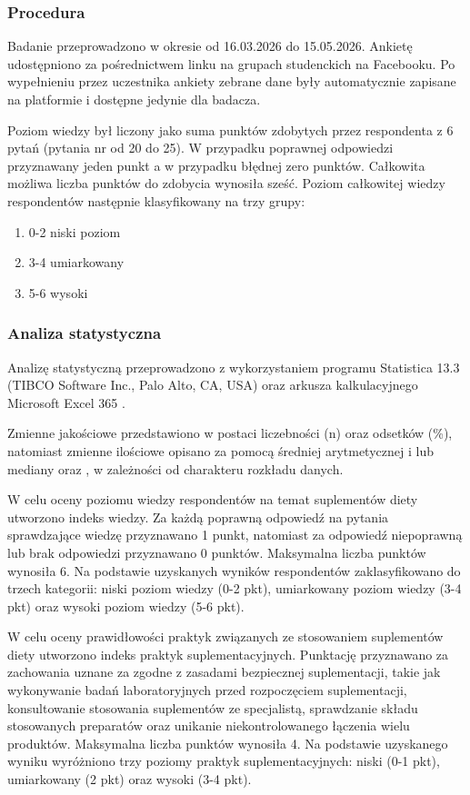 \subsubsection{Procedura}

Badanie przeprowadzono w okresie od 16.03.2026 do 15.05.2026. Ankietę udostępniono za pośrednictwem linku na grupach studenckich na Facebooku. Po wypełnieniu przez uczestnika ankiety zebrane dane były automatycznie zapisane na platformie i dostępne jedynie dla badacza.

Poziom wiedzy był liczony jako suma punktów zdobytych przez respondenta z 6 pytań (pytania nr od 20 do 25). W przypadku poprawnej odpowiedzi przyznawany jeden punkt a w przypadku błędnej zero punktów. Całkowita możliwa liczba punktów do zdobycia wynosiła sześć. Poziom całkowitej wiedzy respondentów następnie klasyfikowany na trzy grupy:

\begin{enumerate}
    \item 0-2 niski poziom
    \item 3-4 umiarkowany
    \item 5-6 wysoki
\end{enumerate}

\subsubsection{Analiza statystyczna}

Analizę statystyczną przeprowadzono z wykorzystaniem programu Statistica 13.3 (TIBCO Software Inc., Palo Alto, CA, USA) \cite{statistica13} oraz arkusza kalkulacyjnego Microsoft Excel 365 \cite{excel365}.

Zmienne jakościowe przedstawiono w postaci liczebności (n) oraz odsetków (\%), natomiast zmienne ilościowe opisano za pomocą średniej arytmetycznej i  lub mediany oraz , w zależności od charakteru rozkładu danych.

W celu oceny poziomu wiedzy respondentów na temat suplementów diety utworzono indeks wiedzy. Za każdą poprawną odpowiedź na pytania sprawdzające wiedzę przyznawano 1 punkt, natomiast za odpowiedź niepoprawną lub brak odpowiedzi przyznawano 0 punktów. Maksymalna liczba punktów wynosiła 6. Na podstawie uzyskanych wyników respondentów zaklasyfikowano do trzech kategorii: niski poziom wiedzy (0-2 pkt), umiarkowany poziom wiedzy (3-4 pkt) oraz wysoki poziom wiedzy (5-6 pkt).

W celu oceny prawidłowości praktyk związanych ze stosowaniem suplementów diety utworzono indeks praktyk suplementacyjnych. Punktację przyznawano za zachowania uznane za zgodne z zasadami bezpiecznej suplementacji, takie jak wykonywanie badań laboratoryjnych przed rozpoczęciem suplementacji, konsultowanie stosowania suplementów ze specjalistą, sprawdzanie składu stosowanych preparatów oraz unikanie niekontrolowanego łączenia wielu produktów. Maksymalna liczba punktów wynosiła 4. Na podstawie uzyskanego wyniku wyróżniono trzy poziomy praktyk suplementacyjnych: niski (0-1 pkt), umiarkowany (2 pkt) oraz wysoki (3-4 pkt).

